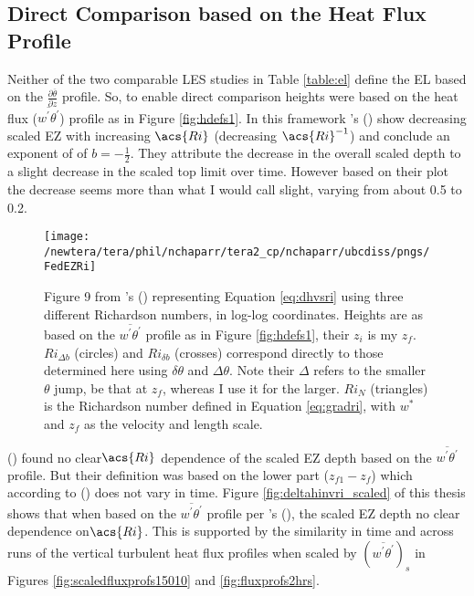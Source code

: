 \subsection{Direct Comparison based on the Heat Flux Profile}

Neither of the two comparable \acs{LES} studies in Table \ref{table:el} define the \acs{EL} based on the $\frac{\partial \overline{\theta}}{\partial z}$ profile.  So, to enable direct comparison heights were based on the heat flux ($\overline{w^{'}\theta^{'}}$) profile as in Figure \ref{fig:hdefs1}.  In this framework \citeauthor{FedConzMir04}'s (\citeyear{FedConzMir04}) show decreasing scaled \acs{EZ} with increasing $\acs{Ri }$ (decreasing $\acs{Ri}^{-1}$) and conclude an exponent of of $b = -\frac{1}{2}$.  They attribute the decrease in the overall scaled depth to a slight decrease in the scaled top limit over time.  However based on their plot the decrease seems more than what I would call slight, varying from about 0.5 to 0.2.\\

\begin{figure}[htbp]
    \centering
    \texttt{[image: /newtera/tera/phil/nchaparr/tera2\_cp/nchaparr/ubcdiss/pngs/FedEZRi]}
    \caption[Plot of the relationship between scaled \acs{EZ} depth and Richardson number from \citeauthor{FedConzMir04}'s (\citeyear{FedConzMir04})]{Figure 9 from \citeauthor{FedConzMir04}'s (\citeyear{FedConzMir04}) representing Equation \ref{eq:dhvsri} using three different Richardson numbers, in log-log coordinates.  Heights are as based on the $\overline{w^{'}\theta^{'}}$ profile as in Figure \ref{fig:hdefs1}, their $z_{i}$ is my $z_{f}$. $Ri_{\Delta b}$ (circles) and $Ri_{\delta b}$ (crosses) correspond directly to those determined here using $\delta \theta$ and $\Delta \theta$.  Note their $\Delta$ refers to the smaller $\theta$ jump, be that at $z_{f}$, whereas I use it for the larger.  $Ri_{N}$ (triangles) is the Richardson number defined in Equation \ref{eq:gradri}, with $w^{*}$ and $z_{f}$ as the velocity and length scale.}
    \label{fig:FedEZRi}   %
\end{figure}


 \citeauthor{BrooksFowler2} (\citeyear{BrooksFowler2}) found no clear$\acs{Ri}$ dependence of the scaled \acs{EZ} depth based on the $\overline{w^{'}\theta^{'}}$ profile.  But their definition was based on the lower part ($z_{f1} - z_{f}$) which according to \citeauthor{FedConzMir04} (\citeyear{FedConzMir04}) does not vary in time.  Figure \ref{fig:deltahinvri_scaled} of this thesis shows that when based on the $\overline{w^{'}\theta^{'}}$ profile per \citeauthor{FedConzMir04}'s (\citeyear{FedConzMir04}), the scaled \acs{EZ} depth no clear dependence on$\acs{Ri}$. This is supported by the similarity in time and across runs of the vertical turbulent heat flux profiles when scaled by $(\overline{w^{'}\theta^{'}})_{s}$ in Figures \ref{fig:scaledfluxprofs15010} and \ref{fig:fluxprofs2hrs}.\\

